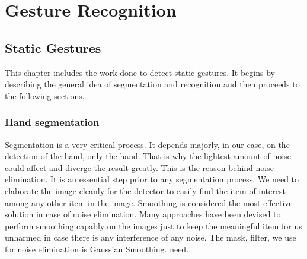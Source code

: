 \chapter{Gesture Recognition}
\label{ch_gesture}

\section{Static Gestures}
This chapter includes the work done to detect static gestures. It begins by describing the general idea of segmentation and recognition and then proceeds to the following sections.\bigskip


\subsection{Hand segmentation}
Segmentation is a very critical process. It depends majorly, in our case, on the detection of the hand, only the hand. That is why the lightest amount of noise could affect and diverge the result greatly. This is the reason behind noise elimination. It is an essential step prior to any segmentation process. We need to elaborate the image cleanly for the detector to easily find the item of interest among any other item in the image. Smoothing is considered the most effective solution in case of noise elimination. Many approaches have been devised to perform smoothing capably on the images just to keep the meaningful item for us unharmed in case there is any interference of any noise. The mask, filter, we use for noise elimination is Gaussian Smoothing.
need.\bigskip
